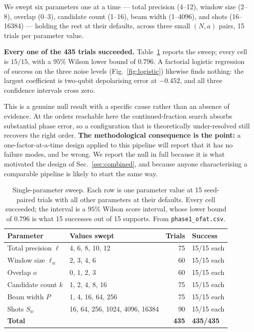 \documentclass[preprint,11pt]{elsarticle}
\begin{document}
We swept six parameters one at a time --- total precision (4--12), window
size (2--8), overlap (0--3), candidate count (1--16), beam width (1--4096),
and shots (16--16384) --- holding the rest at their defaults, across three
small $(N,a)$ pairs, 15 trials per parameter value.

\textbf{Every one of the 435 trials succeeded.} Table~\ref{tab:ofat}
reports the sweep; every cell is $15/15$, with a $95\%$ Wilson lower bound of
$0.796$. A factorial logistic regression of success on the three noise
levels (Fig.~\ref{fig:logistic}) likewise finds nothing: the largest
coefficient is two-qubit depolarising error at $-0.452$, and all three
confidence intervals cross zero.

This is a genuine null result with a specific cause rather than an absence of
evidence. At the orders reachable here the continued-fraction search absorbs
substantial phase error, so a configuration that is theoretically
under-resolved still recovers the right order. \textbf{The methodological
consequence is the point:} a one-factor-at-a-time design applied to this
pipeline will report that it has no failure modes, and be wrong. We report
the null in full because it is what motivated the design of
Sec.~\ref{sec:combined}, and because anyone characterising a comparable
pipeline is likely to start the same way.

\begin{table}[htbp]
\centering\small
\caption{Single-parameter sweep. Each row is one parameter value at 15
seed-paired trials with all other parameters at their defaults. Every cell
succeeded; the interval is a $95\%$ Wilson score interval, whose lower bound
of $0.796$ is what 15 successes out of 15 supports. From
\texttt{phase1\_ofat.csv}.}
\label{tab:ofat}
\begin{tabular}{@{}llrl@{}}
\toprule
Parameter & Values swept & Trials & Success \\
\midrule
Total precision $\ell$   & 4, 6, 8, 10, 12          & 75 & 15/15 each \\
Window size $\ell_w$     & 2, 3, 4, 6               & 60 & 15/15 each \\
Overlap $o$              & 0, 1, 2, 3               & 60 & 15/15 each \\
Candidate count $k$      & 1, 2, 4, 8, 16           & 75 & 15/15 each \\
Beam width $P$           & 1, 4, 16, 64, 256        & 75 & 15/15 each \\
Shots $S_w$              & 16, 64, 256, 1024, 4096, 16384 & 90 & 15/15 each \\
\midrule
\textbf{Total}           &                          & \textbf{435} & \textbf{435/435} \\
\bottomrule
\end{tabular}
\end{table}
\end{document}
